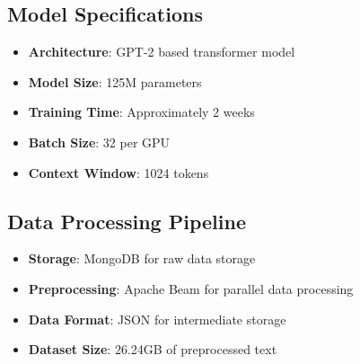\subsection{Model Specifications}
\begin{itemize}
    \item \textbf{Architecture}: GPT-2 based transformer model
    \item \textbf{Model Size}: 125M parameters
    \item \textbf{Training Time}: Approximately 2 weeks
    \item \textbf{Batch Size}: 32 per GPU
    \item \textbf{Context Window}: 1024 tokens
\end{itemize}

\subsection{Data Processing Pipeline}
\begin{itemize}
    \item \textbf{Storage}: MongoDB for raw data storage
    \item \textbf{Preprocessing}: Apache Beam for parallel data processing
    \item \textbf{Data Format}: JSON for intermediate storage
    \item \textbf{Dataset Size}: 26.24GB of preprocessed text
\end{itemize}